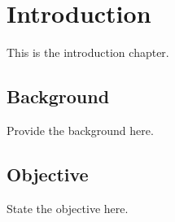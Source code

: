 \chapter{Introduction}

This is the introduction chapter.

\section{Background}
Provide the background here.

\section{Objective}
State the objective here.

